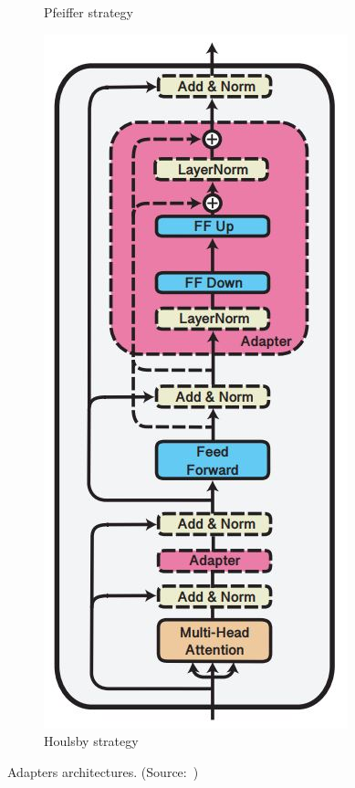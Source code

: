 \begin{figure}[H]
\begin{subfigure}[b]{0.3\textwidth}
         \caption{Pfeiffer strategy}
         \label{fig:adapters_pfeiffer}
     \end{subfigure}
     \hspace{40px}
     \begin{subfigure}[b]{0.302\textwidth}
         \centering
         \includegraphics[width=\textwidth]{figures/adapters_houlsby.JPG}
         \caption{Houlsby strategy}
         \label{fig:adapters_houlsby}
     \end{subfigure}
    \caption{Adapters architectures. (Source:~\cite{pfeiffer2021adapterfusion})}
    \label{fig:adapters}
\end{figure}

